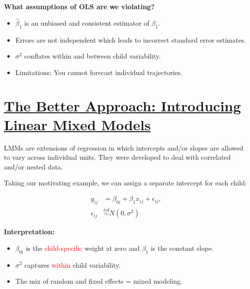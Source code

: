 \documentclass[
  letterpaper,
  DIV=11,
  numbers=noendperiod]{scrreprt}
\providecommand{\tightlist}{%
  \setlength{\itemsep}{0pt}\setlength{\parskip}{0pt}}\usepackage{longtable,booktabs,array}
\begin{document}
\textbf{What assumptions of OLS are we violating?}

\begin{itemize}
\item
  \(\hat{\beta}_1\) is an unbiased and consistent estimator of
  \(\beta_1\).
\item
  Errors are not independent which leads to incorrect standard error
  estimates.
\item
  \(\sigma^2\) conflates within and between child variability.
\item
  Limitations: You cannot forecast individual trajectories.
\end{itemize}

\hypertarget{the-better-approach-introducing-linear-mixed-models}{%
\section*{\texorpdfstring{\ul{The Better Approach: Introducing Linear
Mixed
Models}}{The Better Approach: Introducing Linear Mixed Models}}\label{the-better-approach-introducing-linear-mixed-models}}


LMMs are extensions of regression in which intercepts and/or slopes are
allowed to vary across individual units. They were developed to deal
with correlated and/or nested data.

Taking our motivating example, we can assign a separate intercept for
each child:

\[
\begin{align*}
y_{ij} &= \beta_{0i} + \beta_1 x_{ij} + \epsilon_{ij}, \\
\epsilon_{ij} & \overset{iid}{\sim} N(0, \sigma^2)
\end{align*}
\]

\textbf{Interpretation:}

\begin{itemize}
\tightlist
\item
  \(\beta_{0i}\) is the \textcolor{red}{child-specific} weight at zero
  and \(\beta_1\) is the constant slope.
\item
  \(\sigma^2\) captures \textcolor{red}{within} child variability.
\item
  The mix of random and fixed effects = mixed modeling.
\end{itemize}
\end{document}

